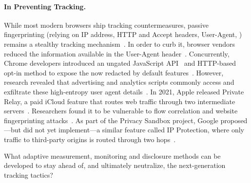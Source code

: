 \paragraph{In Preventing Tracking.}
While most modern browsers ship tracking countermeasures, passive fingerprinting (relying on IP address, HTTP and Accept headers, User-Agent, \etc{}) remains a stealthy tracking mechanism~\cite{mayerThirdPartyWebTracking2012,dotyMitigatingBrowserFingerprinting2019,fraihiClientsideServersideTracking2024}.
In order to curb it, browser vendors reduced the information available in the User-Agent header~\cite{davisReleaseNotesSafari2017,kimura1609304ReduceGeckos2020,googleWhatUserAgentReduction2024}.
%
Concurrently, Chrome developers introduced an ungated JavaScript API~\cite{mdnUserAgentClientHints2024,taylorUserAgentClientHints2024a} and HTTP-based opt-in method to expose the now redacted by default features~\cite{mdnHTTPClientHints2024}. However, research revealed that advertising and analytics scripts commonly access and exfiltrate these high-entropy user agent details~\cite{intumwayaseUARadarExploringImpact2023,senolUnveilingImpactUserAgent2023}.
In 2021, Apple released Private Relay, a paid iCloud feature that routes web traffic through two intermediate servers~\cite{appleICloudPrivateRelay2021}. Researchers found it to be vulnerable to flow correlation and website fingerprinting attacks~\cite{zohaibInvestigatingTrafficAnalysis2023}.
%
As part of the Privacy Sandbox project, Google proposed---but did not yet implement---a similar feature called IP Protection, where only traffic to third-party origins is routed through two hops~\cite{googleIPProtectionPrivacy2024}.

\begin{opbox}
What adaptive measurement, monitoring and disclosure methods can be developed to stay ahead of, and ultimately neutralize, the next-generation tracking tactics?
\end{opbox}
\vspace{-3mm}


